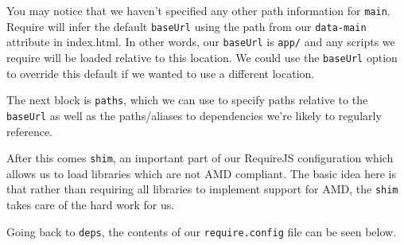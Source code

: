 \documentclass[9pt]{book}
\begin{document}
You may notice that we haven't specified any other path information for
\texttt{main}. Require will infer the default \texttt{baseUrl} using the
path from our \texttt{data-main} attribute in index.html. In other
words, our \texttt{baseUrl} is \texttt{app/} and any scripts we require
will be loaded relative to this location. We could use the
\texttt{baseUrl} option to override this default if we wanted to use a
different location.

The next block is \texttt{paths}, which we can use to specify paths
relative to the \texttt{baseUrl} as well as the paths/aliases to
dependencies we're likely to regularly reference.

After this comes \texttt{shim}, an important part of our RequireJS
configuration which allows us to load libraries which are not AMD
compliant. The basic idea here is that rather than requiring all
libraries to implement support for AMD, the \texttt{shim} takes care of
the hard work for us.

Going back to \texttt{deps}, the contents of our \texttt{require.config}
file can be seen below.
\end{document}
